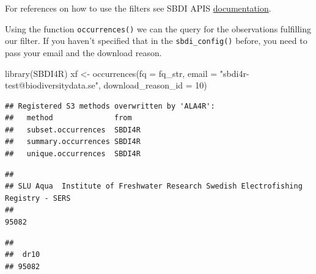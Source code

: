 \documentclass[
  10pt,
]{article}
\newenvironment{Shaded}{\begin{snugshade}}{\end{snugshade}}
\newcommand{\AttributeTok}[1]{\textcolor[rgb]{0.77,0.63,0.00}{#1}}
\newcommand{\CommentTok}[1]{\textcolor[rgb]{0.56,0.35,0.01}{\textit{#1}}}
\newcommand{\DecValTok}[1]{\textcolor[rgb]{0.00,0.00,0.81}{#1}}
\newcommand{\FunctionTok}[1]{\textcolor[rgb]{0.00,0.00,0.00}{#1}}
\newcommand{\NormalTok}[1]{#1}
\newcommand{\OtherTok}[1]{\textcolor[rgb]{0.56,0.35,0.01}{#1}}
\newcommand{\SpecialCharTok}[1]{\textcolor[rgb]{0.00,0.00,0.00}{#1}}
\newcommand{\StringTok}[1]{\textcolor[rgb]{0.31,0.60,0.02}{#1}}
\begin{document}
For references on how to use the filters see SBDI APIS \href{https://api.biodiversitydata.se/?lang=en-US\#ws3}{documentation}.

Using the function \texttt{occurrences()} we can the query for the observations fulfilling our filter. If you haven't specified that in the \texttt{sbdi\_config()} before, you need to pass your email and the download reason.

\begin{Shaded}
\begin{Highlighting}[]
\FunctionTok{library}\NormalTok{(SBDI4R)}
\NormalTok{xf }\OtherTok{\textless{}{-}} \FunctionTok{occurrences}\NormalTok{(}\AttributeTok{fq =}\NormalTok{ fq\_str,}
                 \AttributeTok{email =} \StringTok{"sbdi4r{-}test@biodiversitydata.se"}\NormalTok{, }
                 \AttributeTok{download\_reason\_id =} \DecValTok{10}\NormalTok{)}
\end{Highlighting}
\end{Shaded}

\begin{verbatim}
## Registered S3 methods overwritten by 'ALA4R':
##   method              from  
##   subset.occurrences  SBDI4R
##   summary.occurrences SBDI4R
##   unique.occurrences  SBDI4R
\end{verbatim}

\begin{Shaded}
\end{Shaded}

\begin{verbatim}
## 
## SLU Aqua  Institute of Freshwater Research Swedish Electrofishing Registry - SERS 
##                                                                             95082
\end{verbatim}

\begin{Shaded}
\end{Shaded}

\begin{verbatim}
## 
##  dr10 
## 95082
\end{verbatim}
\end{document}
